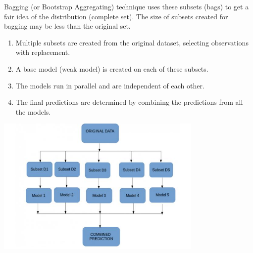 Bagging (or Bootstrap Aggregating) technique uses these subsets (bags) to get a fair idea of the distribution (complete set). The size of subsets created for bagging may be less than the original set.
\begin{enumerate}
    \item Multiple subsets are created from the original dataset, selecting observations with replacement.
    \item A base model (weak model) is created on each of these subsets.
    \item The models run in parallel and are independent of each other.
    \item The final predictions are determined by combining the predictions from all the models.
\end{enumerate}
\begin{center}
    \includegraphics[width=10cm]{Images/A8_img1.jpg}
\end{center}
